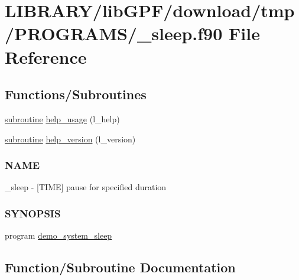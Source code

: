\hypertarget{__sleep_8f90}{}\section{L\+I\+B\+R\+A\+R\+Y/lib\+G\+P\+F/download/tmp/\+P\+R\+O\+G\+R\+A\+M\+S/\+\_\+sleep.f90 File Reference}
\label{__sleep_8f90}
\subsection*{Functions/\+Subroutines}
\begin{DoxyCompactItemize}
\item 
\hyperlink{M__stopwatch_83_8txt_acfbcff50169d691ff02d4a123ed70482}{subroutine} \hyperlink{__sleep_8f90_a3e09a3b52ee8fb04eeb93fe5761626a8}{help\+\_\+usage} (l\+\_\+help)
\item 
\hyperlink{M__stopwatch_83_8txt_acfbcff50169d691ff02d4a123ed70482}{subroutine} \hyperlink{__sleep_8f90_a39c21619b08a3c22f19e2306efd7f766}{help\+\_\+version} (l\+\_\+version)
\begin{DoxyCompactList}\small\item\em \subsubsection*{N\+A\+ME}

\+\_\+sleep -\/ \mbox{[}T\+I\+ME\mbox{]} pause for specified duration \subsubsection*{S\+Y\+N\+O\+P\+S\+IS}\end{DoxyCompactList}\item 
program \hyperlink{__sleep_8f90_adea2b9826964203f987d029f48afa37a}{demo\+\_\+system\+\_\+sleep}
\end{DoxyCompactItemize}


\subsection{Function/\+Subroutine Documentation}
\mbox{\label{__sleep_8f90_adea2b9826964203f987d029f48afa37a}} 

